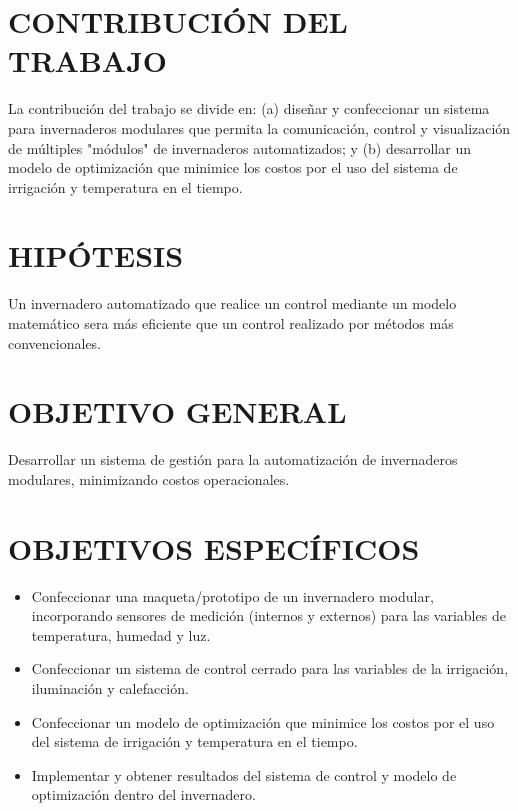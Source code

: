 \documentclass[12pt,a4paper]{article}
\begin{document}
\begin{table}[h!]
\centering
{}
\end{table}


	

		
		
		
	
		

\section{CONTRIBUCIÓN DEL TRABAJO}
	La contribución del trabajo se divide en: (a) diseñar y confeccionar un sistema para invernaderos modulares que permita la comunicación, control y visualización de  múltiples "módulos" de invernaderos automatizados; y (b) desarrollar un modelo de optimización que minimice los costos por el uso del sistema de irrigación y temperatura en el tiempo.
	
\section{HIPÓTESIS}

Un invernadero automatizado que realice un control mediante un modelo matemático sera más eficiente que un control realizado por métodos más convencionales.

\section{OBJETIVO GENERAL}

Desarrollar un sistema de gestión para la automatización de invernaderos modulares, minimizando costos operacionales.

\section{OBJETIVOS ESPECÍFICOS}
	\begin{itemize}
    	\item   Confeccionar una maqueta/prototipo de un invernadero modular, incorporando sensores de medición (internos y externos) para las variables de temperatura, humedad y luz.
    	\item Confeccionar un sistema de control cerrado para las variables de la irrigación, iluminación y calefacción.
        \item 	Confeccionar un modelo de optimización que minimice los costos por el uso del sistema de irrigación y temperatura en el tiempo.
        \item 	Implementar y obtener resultados del sistema de control y modelo de optimización dentro del invernadero.

	\end{itemize}
	
\end{document}
